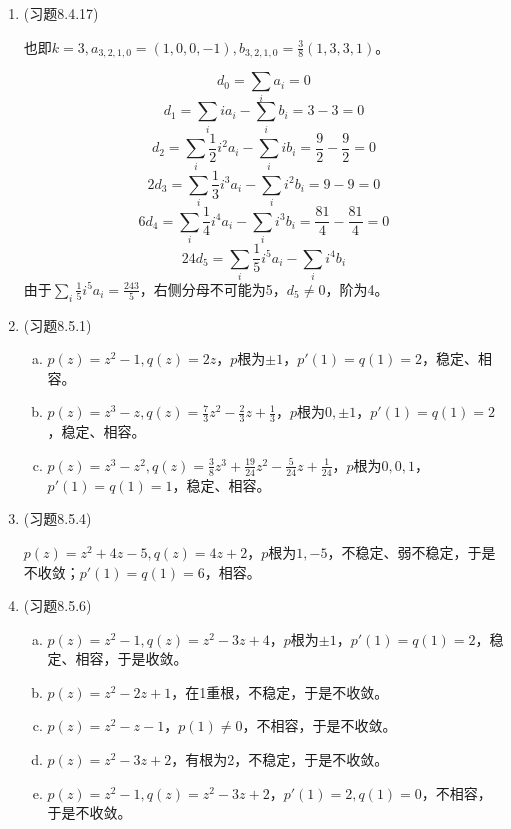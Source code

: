 \documentclass[a4paper,UTF8,fontset=windows]{ctexart}
\begin{document}
\begin{enumerate}
    \item (习题8.4.17)
    
    也即$k=3,a_{3,2,1,0}=(1,0,0,-1),b_{3,2,1,0}=\frac{3}{8}(1,3,3,1)$。
    
    $$d_0=\sum_ia_i=0$$
    $$d_1=\sum_iia_i-\sum_ib_i=3-3=0$$
    $$d_2=\sum_i\frac{1}{2}i^2a_i-\sum_iib_i=\frac{9}{2}-\frac{9}{2}=0$$
    $$2d_3=\sum_i\frac{1}{3}i^3a_i-\sum_ii^2b_i=9-9=0$$
    $$6d_4=\sum_i\frac{1}{4}i^4a_i-\sum_ii^3b_i=\frac{81}{4}-\frac{81}{4}=0$$
    $$24d_5=\sum_i\frac{1}{5}i^5a_i-\sum_ii^4b_i$$
    由于$\sum_i\frac{1}{5}i^5a_i=\frac{243}{5}$，右侧分母不可能为5，$d_5\ne0$，阶为4。
    
    \item (习题8.5.1)
    \begin{enumerate}[a.]
    \item
    $p(z)=z^2-1,q(z)=2z$，$p$根为$\pm 1$，$p'(1)=q(1)=2$，稳定、相容。
    
    \item
    $p(z)=z^3-z,q(z)=\frac{7}{3}z^2-\frac{2}{3}z+\frac{1}{3}$，$p$根为$0,\pm1$，$p'(1)=q(1)=2$，稳定、相容。
    
    \item
    $p(z)=z^3-z^2,q(z)=\frac{3}{8}z^3+\frac{19}{24}z^2-\frac{5}{24}z+\frac{1}{24}$，$p$根为$0,0,1$，$p'(1)=q(1)=1$，稳定、相容。
    \end{enumerate}
    
    \item (习题8.5.4)
    
    $p(z)=z^2+4z-5,q(z)=4z+2$，$p$根为$1,-5$，不稳定、弱不稳定，于是不收敛；$p'(1)=q(1)=6$，相容。
    
    \item (习题8.5.6)
    \begin{enumerate}[a.]
    \item
    $p(z)=z^2-1,q(z)=z^2-3z+4$，$p$根为$\pm1$，$p'(1)=q(1)=2$，稳定、相容，于是收敛。
    
    \item
    $p(z)=z^2-2z+1$，在1重根，不稳定，于是不收敛。
    
    \item
    $p(z)=z^2-z-1$，$p(1)\ne0$，不相容，于是不收敛。
    
    \item
    $p(z)=z^2-3z+2$，有根为2，不稳定，于是不收敛。
    
    \item
    $p(z)=z^2-1,q(z)=z^2-3z+2$，$p'(1)=2,q(1)=0$，不相容，于是不收敛。
    \end{enumerate}
    

\end{enumerate}
\end{document}
